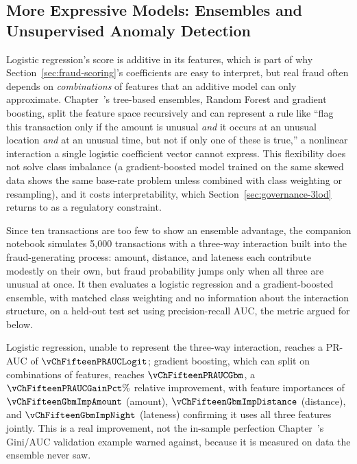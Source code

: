 \documentclass[../ai_in_finance]{subfiles}
\begin{document}
\subsection{More Expressive Models: Ensembles and Unsupervised Anomaly Detection}
\label{sec:expressive-models}

Logistic regression's score is additive in its features, which is part of why Section~\ref{sec:fraud-scoring}'s coefficients are easy to interpret, but real fraud often depends on \emph{combinations} of features that an additive model can only approximate. Chapter~'s tree-based ensembles, Random Forest and gradient boosting, split the feature space recursively and can represent a rule like ``flag this transaction only if the amount is unusual \emph{and} it occurs at an unusual location \emph{and} at an unusual time, but not if only one of these is true,'' a nonlinear interaction a single logistic coefficient vector cannot express. This flexibility does not solve class imbalance (a gradient-boosted model trained on the same skewed data shows the same base-rate problem unless combined with class weighting or resampling), and it costs interpretability, which Section~\ref{sec:governance-3lod} returns to as a regulatory constraint.

Since ten transactions are too few to show an ensemble advantage, the companion notebook simulates 5,000 transactions with a three-way interaction built into the fraud-generating process: amount, distance, and lateness each contribute modestly on their own, but fraud probability jumps only when all three are unusual at once. It then evaluates a logistic regression and a gradient-boosted ensemble, with matched class weighting and no information about the interaction structure, on a held-out test set using precision-recall AUC, the metric argued for below.

Logistic regression, unable to represent the three-way interaction, reaches a PR-AUC of $\vChFifteenPRAUCLogit$; gradient boosting, which can split on combinations of features, reaches $\vChFifteenPRAUCGbm$, a $\vChFifteenPRAUCGainPct\%$ relative improvement, with feature importances of $\vChFifteenGbmImpAmount$ (amount), $\vChFifteenGbmImpDistance$ (distance), and $\vChFifteenGbmImpNight$ (lateness) confirming it uses all three features jointly. This is a real improvement, not the in-sample perfection Chapter~'s Gini/AUC validation example warned against, because it is measured on data the ensemble never saw.
\end{document}
